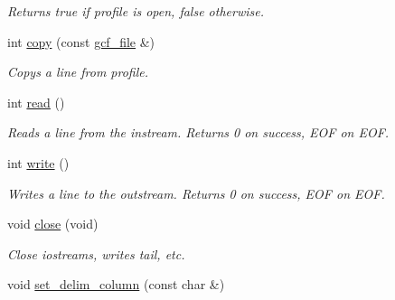 \begin{DoxyCompactItemize}
\begin{DoxyCompactList}\small\item\em Returns true if profile is open, false otherwise. \end{DoxyCompactList}\item 
\hypertarget{classmap__file_a383b714f0c046a0fc42de12420745456}{int \hyperlink{classmap__file_a383b714f0c046a0fc42de12420745456}{copy} (const \hyperlink{classmap__file_aca4db854f13eafc3cd56d11554d5af8d}{gcf\-\_\-file} \&)}\label{classmap__file_a383b714f0c046a0fc42de12420745456}

\begin{DoxyCompactList}\small\item\em Copys a line from profile. \end{DoxyCompactList}\item 
\hypertarget{classmap__file_ab8e14efacf5201f1e11921ab3197e7d8}{int \hyperlink{classmap__file_ab8e14efacf5201f1e11921ab3197e7d8}{read} ()}\label{classmap__file_ab8e14efacf5201f1e11921ab3197e7d8}

\begin{DoxyCompactList}\small\item\em Reads a line from the instream. Returns 0 on success, E\-O\-F on E\-O\-F. \end{DoxyCompactList}\item 
\hypertarget{classmap__file_aeda25f7ec80c11621554cae62729141e}{int \hyperlink{classmap__file_aeda25f7ec80c11621554cae62729141e}{write} ()}\label{classmap__file_aeda25f7ec80c11621554cae62729141e}

\begin{DoxyCompactList}\small\item\em Writes a line to the outstream. Returns 0 on success, E\-O\-F on E\-O\-F. \end{DoxyCompactList}\item 
\hypertarget{classmap__file_ab16be151908332859a30886fa16633dd}{void \hyperlink{classmap__file_ab16be151908332859a30886fa16633dd}{close} (void)}\label{classmap__file_ab16be151908332859a30886fa16633dd}

\begin{DoxyCompactList}\small\item\em Close iostreams, writes tail, etc. \end{DoxyCompactList}\item 
\hypertarget{classmap__file_af80feb6d21d386c98e026040efa7e35b}{void \hyperlink{classmap__file_af80feb6d21d386c98e026040efa7e35b}{set\-\_\-delim\-\_\-column} (const char \&)}\label{classmap__file_af80feb6d21d386c98e026040efa7e35b}


\end{DoxyCompactItemize}
